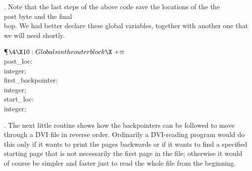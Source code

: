 . Note that the last steps of the above code save the locations of the
the \\{post} byte and the final \\{bop}.  We had better declare these global
variables, together with another one that we will need shortly.

\Y\P$\4\X10:Globals in the outer block\X\mathrel{+}\S$\6
\4\\{post\_loc}: \\{integer};\6
\4\\{first\_backpointer}: \\{integer};\6
\4\\{start\_loc}: \\{integer};%
\par
\fi

. The next little routine shows how the backpointers can be followed
to move through a \.{DVI} file in reverse order. Ordinarily a \.{DVI}-reading
program would do this only if it wants to print the pages backwards or
if it wants to find a specified starting page that is not necessarily the
first page in the file; otherwise it would of course be simpler and faster
just to read the whole file from the beginning.

